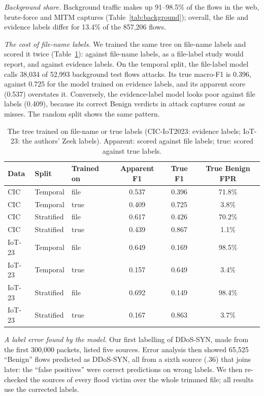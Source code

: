 \emph{Background share.} Background traffic makes up 91--98.5\% of the flows in the web, brute-force and MITM captures (Table~\ref{tab:background}); overall, the file and evidence labels differ for 13.4\% of the 857,206 flows.

\emph{The cost of file-name labels.} We trained the same tree on file-name labels and scored it twice (Table~\ref{tab:filelabel}): against file-name labels, as a file-label study would report, and against evidence labels. On the temporal split, the file-label model calls 38,034 of 52,993 background test flows attacks. Its true macro-F1 is 0.396, against 0.725 for the model trained on evidence labels, and its apparent score (0.537) overstates it. Conversely, the evidence-label model looks poor against file labels (0.409), because its correct Benign verdicts in attack captures count as misses. The random split shows the same pattern.

\begin{table}[t]
\centering
\caption{The tree trained on file-name or true labels (CIC-IoT2023: evidence labels; IoT-23: the authors' Zeek labels). Apparent: scored against file labels; true: scored against true labels.}
\label{tab:filelabel}
\footnotesize
\setlength{\tabcolsep}{3pt}
\begin{tabular}{lllccc}
\hline
Data & Split & Trained on & Apparent F1 & True F1 & True Benign FPR \\
\hline
CIC & Temporal   & file & 0.537 & 0.396 & 71.8\% \\
CIC & Temporal   & true & 0.409 & 0.725 & 3.8\% \\
CIC & Stratified & file & 0.617 & 0.426 & 70.2\% \\
CIC & Stratified & true & 0.439 & 0.867 & 1.1\% \\
\hline
IoT-23 & Temporal   & file & 0.649 & 0.169 & 98.5\% \\
IoT-23 & Temporal   & true & 0.157 & 0.649 & 3.4\% \\
IoT-23 & Stratified & file & 0.692 & 0.149 & 98.4\% \\
IoT-23 & Stratified & true & 0.167 & 0.863 & 3.7\% \\
\hline
\end{tabular}
\end{table}

\emph{A label error found by the model.} Our first labelling of DDoS-SYN, made from the first 300,000 packets, listed five sources. Error analysis then showed 65,525 ``Benign'' flows predicted as DDoS-SYN, all from a sixth source (.36) that joins later: the ``false positives'' were correct predictions on wrong labels. We then re-checked the sources of every flood victim over the whole trimmed file; all results use the corrected labels.

